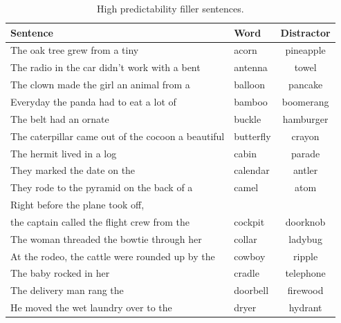 \begin{table}[!ht]
\caption{High predictability filler sentences.}
\label{tbl:senthighfiller}
\small
\centering
\begin{tabular}{llc}
\toprule
Sentence                                                                     & Word        & Distractor  \\
\midrule
The oak tree grew from a tiny                                                & acorn       & pineapple   \\
The radio in the car didn't work with a bent                                 & antenna     & towel       \\
The clown made the girl an animal from a                                     & balloon     & pancake     \\
Everyday the panda had to eat a lot of                                       & bamboo      & boomerang   \\
The belt had an ornate                                                       & buckle      & hamburger   \\
The caterpillar came out of the cocoon a beautiful                           & butterfly   & crayon      \\
The hermit lived in a log                                                    & cabin       & parade      \\
They marked the date on the                                                  & calendar    & antler      \\
They rode to the pyramid on the back of a                                    & camel       & atom        \\
Right before the plane took off,  & & \\
the captain called the flight crew from the & cockpit     & doorknob    \\
The woman threaded the bowtie through her                                    & collar      & ladybug     \\
At the rodeo, the cattle were rounded up by the                              & cowboy      & ripple      \\
The baby rocked in her                                                       & cradle      & telephone   \\
The delivery man rang the                                                    & doorbell    & firewood    \\
He moved the wet laundry over to the                                         & dryer       & hydrant     \\

\end{tabular}
\end{table}
